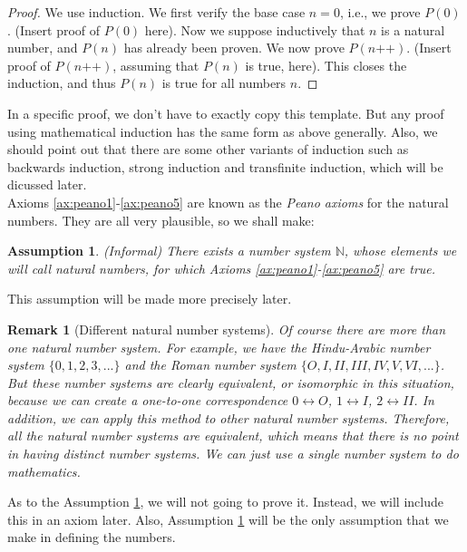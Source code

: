 \documentclass[a4paper]{book}
\newtheorem*{proof}{\textit{Proof.}}
\newtheorem{assumption}{Assumption}[chapter]
\newtheorem{remark}{Remark}[section]
\begin{document}
			\begin{proof}
				We use induction. We first verify the base case $n=0$, i.e., we prove $P(0)$. (Insert proof of $P(0)$ here). Now we suppose inductively that $n$ is a natural number, and $P(n)$ has already been proven. We now prove $P(n\texttt{++})$. (Insert proof of $P(n \texttt{++})$, assuming that $P(n)$ is true, here). This closes the induction, and thus $P(n)$ is true for all numbers $n$.
			\end{proof}
			In a specific proof, we don't have to exactly copy this template. But any proof using mathematical induction has the same form as above generally. Also, we should point out that there are some other variants of induction such as backwards induction, strong induction and transfinite induction, which will be dicussed later.\\
			Axioms \ref{ax:peano1}-\ref{ax:peano5} are known as the \textit{Peano axioms} for the natural numbers. They are all very plausible, so we shall make:
			\begin{assumption}
				\label{assumption1}
				(Informal) There exists a number system $\mathbb{N}$, whose elements we will call natural numbers, for which Axioms \ref{ax:peano1}-\ref{ax:peano5} are true.
			\end{assumption}
			This assumption will be made more precisely later.
			\begin{remark}[Different natural number systems]
				Of course there are more than one natural number system. For example, we have the Hindu-Arabic number system $\{0,1,2,3,...\}$ and the Roman number system $\{O,I,I\!I,I\!I\!I,I\!V,V,V\!I,...\}$. But these number systems are clearly equivalent, or isomorphic in this situation, because we can create a one-to-one correspondence $0\leftrightarrow O$, $1\leftrightarrow I$, $2\leftrightarrow I\!I$. In addition, we can apply this method to other natural number systems. Therefore, all the natural number systems are equivalent, which means that there is no point in having distinct number systems. We can just use a single number system to do mathematics.
			\end{remark}
			As to the Assumption \ref{assumption1}, we will not going to prove it. Instead, we will include this in an axiom later. Also, Assumption \ref{assumption1} will be the only assumption that we make in defining the numbers.
\end{document}
